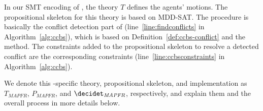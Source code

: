 
In our SMT encoding of \mapfr, the theory $T$ defines the agents' motions. 
The propositional skeleton for this theory is based on MDD-SAT. 
The \decidet procedure is basically the conflict detection part of \ccbs (line~\ref{line:findconflicts} in Algorithm~\ref{alg:ccbs}), which is based on Definition~\ref{def:ccbs-conflict} and the \inconflict method. 
The constraints added to the propositional skeleton to resolve a detected conflict are the corresponding \ccbs constraints (line~\ref{line:ccbsconstraints} in Algorithm~\ref{alg:ccbs}). 

We denote this \mapfr-specific theory, propositional skeleton, and \decidet implementation as $T_{\textit{MAPFR}}$, 
$P_{\textit{MAPFR}}$, 
and $\decidet_{\textit{MAPFR}}$, respectively, and explain them and the overall process in more details below.  


  








